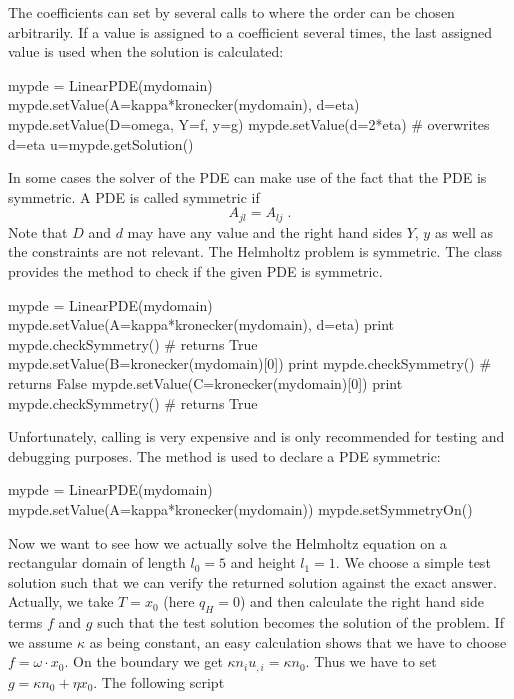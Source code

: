 The coefficients can set by several calls to  where the order
can be chosen arbitrarily. 
If a value is assigned to a coefficient several times, the last assigned value
is used when the solution is calculated:
\begin{python}
  mypde = LinearPDE(mydomain)
  mypde.setValue(A=kappa*kronecker(mydomain), d=eta)
  mypde.setValue(D=omega, Y=f, y=g)
  mypde.setValue(d=2*eta) # overwrites d=eta
  u=mypde.getSolution()
\end{python}
In some cases the solver of the PDE can make use of the fact that the PDE is
symmetric. A PDE is called symmetric if
\begin{equation}\label{LINEARPDE.SINGLE.4  TUTORIAL}
A_{jl}=A_{lj}\;.
\end{equation}
Note that $D$ and $d$ may have any value and the right hand sides $Y$, $y$ as
well as the constraints are not relevant. The Helmholtz problem is symmetric.
The \LinearPDE class provides the method  to check if
the given PDE is symmetric.
\begin{python}
  mypde = LinearPDE(mydomain)
  mypde.setValue(A=kappa*kronecker(mydomain), d=eta)
  print mypde.checkSymmetry() # returns True
  mypde.setValue(B=kronecker(mydomain)[0])
  print mypde.checkSymmetry() # returns False
  mypde.setValue(C=kronecker(mydomain)[0])
  print mypde.checkSymmetry() # returns True
\end{python}
Unfortunately, calling  is very expensive and is only
recommended for testing and debugging purposes.
The  method is used to declare a PDE symmetric:
\begin{python}
  mypde = LinearPDE(mydomain)
  mypde.setValue(A=kappa*kronecker(mydomain))
  mypde.setSymmetryOn()
\end{python}
Now we want to see how we actually solve the Helmholtz equation on a
rectangular domain of length $l_{0}=5$ and height $l_{1}=1$.
We choose a simple test solution such that we can verify the returned solution
against the exact answer. Actually, we take $T=x_{0}$ (here
$q_H = 0$) and then calculate the right hand side terms $f$ and $g$
such that the test solution becomes the solution of the problem.
If we assume $\kappa$ as being constant, an easy calculation shows that we
have to choose $f=\omega \cdot x_{0}$.
On the boundary we get $\kappa n_{i} u_{,i}=\kappa n_{0}$.
Thus we have to set $g=\kappa n_{0}+\eta x_{0}$.
The following script 
